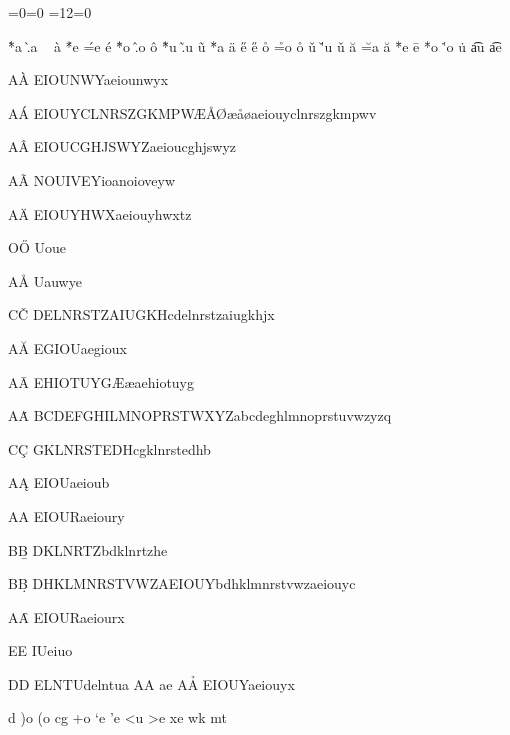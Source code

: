 \documentclass{article}
\begin{document}
\show\cl@A
\setcounter{C}{12}
\ifnum\value{B}=0\else\bad\fi\ifnum\value{C}=0\else\bad\fi
{}
\setcounter{B}{11}
\setcounter{C}{12}
\ifnum\value{C}=12\else\bad\fi\ifnum\value{B}=0\else\bad\fi



\`*a \`.a  \  \`a
\'*e \'=e  \'e
\^*o \^.o  \^o 
\~*u \~.u  \~u 
\"*a \"a 
\H*e \H e 
\r*o \r=o  \r o 
\v*u \v'u  \v u 
\u*a \u=a  \u a 
\=*e \=e
\.*o \.'o   \.u \t*au \t ae

\def\acclist#1#2{\def\theacc{#1}\let\next\oneacc\next#2\relax}
\def\Relax{\relax}
\def\oneacc#1{%
\ifx#1\relax\let\next\relax\else\theacc#1 \fi
\next}

\acclist\`{AEIOUNWYaeiounwyx}\par
\acclist\'{AEIOUYCLNRSZGKMPW\AE\AA\O\ae\aa\o aeiouyclnrszgkmpwv}\par
\acclist\^{AEIOUCGHJSWYZaeioucghjswyz}\par
\acclist\~{ANOUIVEYioanoioveyw}\par
\acclist\"{AEIOUYHWXaeiouyhwxtz}\par
\acclist\H{OUoue}\par
\acclist\r{AUauwye}\par
\acclist\v{CDELNRSTZAIUGKHcdelnrstzaiugkhjx}\par
\acclist\u{AEGIOUaegioux}\par
\acclist\={AEHIOTUYG\AE\ae aehiotuyg}\par
\acclist\.{ABCDEFGHILMNOPRSTWXYZabcdeghlmnoprstuvwzyzq}\par
\acclist\c{CGKLNRSTEDHcgklnrstedhb}\par
\acclist\k{AEIOUaeioub}\par
\acclist\D{AEIOURaeioury}\par
\acclist\b{BDKLNRTZbdklnrtzhe}\par
\acclist\d{BDHKLMNRSTVWZAEIOUYbdhklmnrstvwzaeiouyc}\par
\acclist\f{AEIOURaeiourx}\par
\acclist\T{EIUeiuo}\par
\acclist\V{DELNTUdelntua}
\acclist\D{Aae}
\acclist\h{AEIOUYaeiouyx}


{\makeatletter \global\let\|\@omniaccent}
 \|[t      \textinvsubbridge{d} \|]d
 \|)o    \|(o
 \|c{g}     \textsubplus{\textopeno} \|+o
 \|`e       \textraising{\textepsilon} \|'e  
 \|<u      \textretracting{\textschwa} \|>e
 \|x{e}     \|w{k}
 \|m{t}
\end{document}
